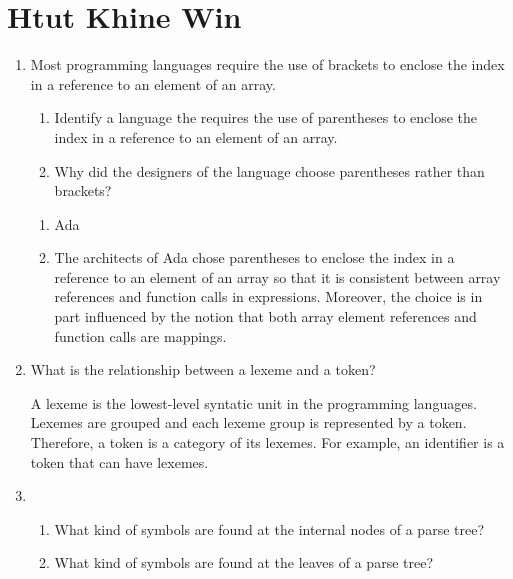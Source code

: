 
\chapter{Htut Khine Win}

\begin{enumerate}
  \item Most programming languages require the use of brackets to
    enclose the index in a reference to an element of an array.
  \begin{enumerate}
    \item Identify a language the requires the use of parentheses
      to enclose the index in a reference to an element of an array.
    \item Why did the designers of the language choose parentheses
      rather than brackets?
    \end{enumerate}

  \begin{answer}

  \begin{enumerate}
    \item Ada
    \item The architects of Ada chose parentheses to enclose the index in a reference to an element of an array so that it is consistent between array references and function calls in expressions. Moreover, the choice is in part influenced by the notion that both array element references and function calls are mappings. 
    \end{enumerate}

    \end{answer}
    
  \item What is the relationship between a lexeme and a token?

  \begin{answer}

    A lexeme is the lowest-level syntatic unit in the programming languages. Lexemes are grouped and each lexeme group is represented by a token. Therefore, a token is a category  of its lexemes. For example, an identifier is a token that can have lexemes.   

    \end{answer}

  \item
  \begin{enumerate}
    \item What kind of symbols are found at the internal nodes of a
      parse tree?
    \item What kind of symbols are found at the leaves of a parse tree?
    \end{enumerate}


\end{enumerate}
